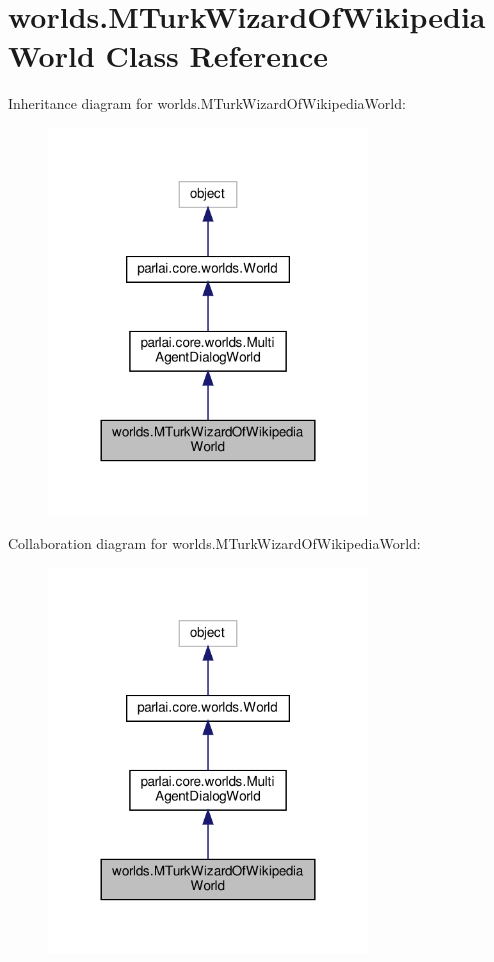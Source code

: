 \hypertarget{classworlds_1_1MTurkWizardOfWikipediaWorld}{}\section{worlds.\+M\+Turk\+Wizard\+Of\+Wikipedia\+World Class Reference}
\label{classworlds_1_1MTurkWizardOfWikipediaWorld}


Inheritance diagram for worlds.\+M\+Turk\+Wizard\+Of\+Wikipedia\+World\+:
\nopagebreak
\begin{figure}[H]
\begin{center}
\leavevmode
\includegraphics[width=240pt]{classworlds_1_1MTurkWizardOfWikipediaWorld__inherit__graph}
\end{center}
\end{figure}


Collaboration diagram for worlds.\+M\+Turk\+Wizard\+Of\+Wikipedia\+World\+:
\nopagebreak
\begin{figure}[H]
\begin{center}
\leavevmode
\includegraphics[width=240pt]{classworlds_1_1MTurkWizardOfWikipediaWorld__coll__graph}
\end{center}
\end{figure}
